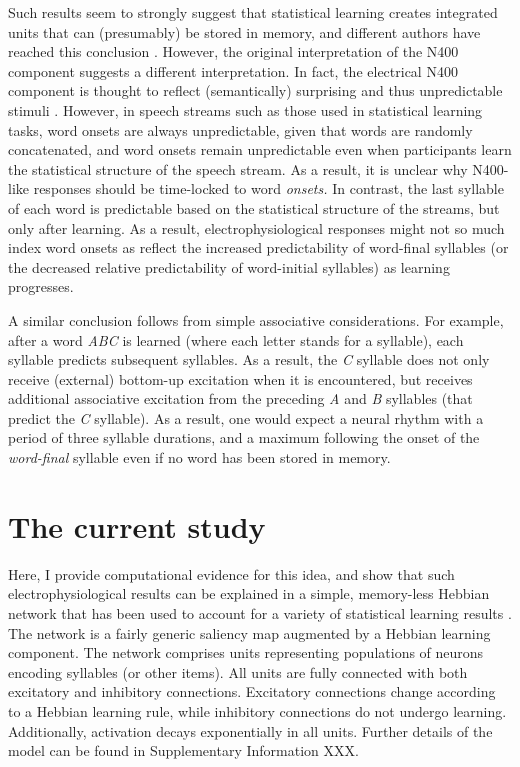 \documentclass[
]{article}
\begin{document}
Such results seem to strongly suggest that statistical learning creates
integrated units that can (presumably) be stored in memory, and
different authors have reached this conclusion
\citep{Batterink2017, Flo2022, Sanders2002, Teinonen2009}. However, the
original interpretation of the N400 component suggests a different
interpretation. In fact, the electrical N400 component is thought to
reflect (semantically) surprising and thus unpredictable stimuli
\citep{Kutas2000}. However, in speech streams such as those used in
statistical learning tasks, word onsets are always unpredictable, given
that words are randomly concatenated, and word onsets remain
unpredictable even when participants learn the statistical structure of
the speech stream. As a result, it is unclear why N400-like responses
should be time-locked to word \emph{onsets.} In contrast, the last
syllable of each word is predictable based on the statistical structure
of the streams, but only after learning. As a result,
electrophysiological responses might not so much index word onsets as
reflect the increased predictability of word-final syllables (or the
decreased relative predictability of word-initial syllables) as learning
progresses.

A similar conclusion follows from simple associative considerations. For
example, after a word \emph{ABC} is learned (where each letter stands
for a syllable), each syllable predicts subsequent syllables. As a
result, the \emph{C} syllable does not only receive (external) bottom-up
excitation when it is encountered, but receives additional associative
excitation from the preceding \emph{A} and \emph{B} syllables (that
predict the \emph{C} syllable). As a result, one would expect a neural
rhythm with a period of three syllable durations, and a maximum
following the onset of the \emph{word-final} syllable even if no word
has been stored in memory.

\hypertarget{the-current-study}{%
\section{The current study}\label{the-current-study}}

Here, I provide computational evidence for this idea, and show that such
electrophysiological results can be explained in a simple, memory-less
Hebbian network that has been used to account for a variety of
statistical learning results \citep{Endress-TP-Model}. The network is a
fairly generic saliency map
\citep{Bays2010, Endress-Catastrophic-Interference, Gottlieb2007, Roggeman2010, Sengupta2014}
augmented by a Hebbian learning component. The network comprises units
representing populations of neurons encoding syllables (or other items).
All units are fully connected with both excitatory and inhibitory
connections. Excitatory connections change according to a Hebbian
learning rule, while inhibitory connections do not undergo learning.
Additionally, activation decays exponentially in all units. Further
details of the model can be found in Supplementary Information XXX.
\end{document}
